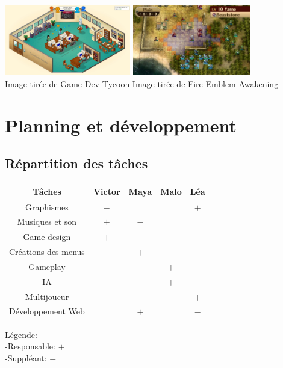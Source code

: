 \documentclass{article}
\begin{document}
\includegraphics[width = 5.5cm]{gamedev.jpg} \hspace{10 pt} \includegraphics[width = 5.1805cm]{18-10.jpg}\\  \scriptsize \hspace{50 pt}Image tirée de Game Dev Tycoon \hspace{75 pt} \scriptsize Image tirée de Fire Emblem Awakening



\section{Planning et développement}
\subsection{Répartition des tâches}
\begin{center}
	\begin{tabular}{|c||c|c|c|c|}
	\hline
    \textbf{Tâches} & \textbf{Victor} & \textbf{Maya} & \textbf{Malo} & \textbf{Léa} \\ \hline
    Graphismes & $-$& & & $+$\\ \hline
    Musiques et son & $+$& $-$& & \\ \hline
    Game design & $+$ & $-$ &  & \\ \hline
    Créations des menus & & $+$& $-$& \\ \hline
    Gameplay & & & $+$ & $-$\\ \hline
    IA & $-$ & & $+$&\\ \hline
    Multijoueur & &  & $-$&$+$\\ 
    \hline
    Développement Web &  & $+$ & & $-$\\ \hline
	\end{tabular}
\end{center}
Légende:\\
\hspace*{1cm}-Responsable: $+$ \\
\hspace*{1cm}-Suppléant: $-$
\end{document}

